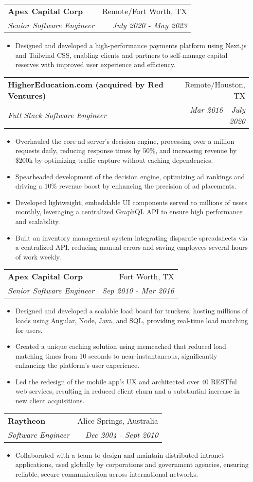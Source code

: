 \documentclass[letterpaper,11pt]{article}
\makeatletter
\newcommand{\resumeItem}[1]{
    \item\small{
      {#1 \vspace{-2pt}}
    }
  }
\newcommand{\resumeSubheading}[4]{
    \vspace{-1pt}\item
      \begin{tabular*}{0.97\textwidth}{l@{\extracolsep{\fill}}r}
        \textbf{#1} & #2 \\
        \textit{\small#3} & \textit{\small #4} \\
      \end{tabular*}\vspace{-5pt}
  }
\newcommand{\resumeItemListStart}{\begin{itemize}}
\newcommand{\resumeItemListEnd}{\end{itemize}\vspace{-5pt}}
\makeatother
\begin{document}
    \resumeSubheading
        {Apex Capital Corp}{Remote/Fort Worth, TX}
        {Senior Software Engineer}{July 2020 - May 2023}
        \resumeItemListStart
          \resumeItem
            {Designed and developed a high-performance payments platform using Next.js and Tailwind CSS, enabling clients and partners to self-manage capital reserves with improved user experience and efficiency.}
        \resumeItemListEnd

      \resumeSubheading
        {HigherEducation.com (acquired by Red Ventures)}{Remote/Houston, TX}
        {Full Stack Software Engineer}{Mar 2016 - July 2020}
        \resumeItemListStart
          \resumeItem
            {Overhauled the core ad server's decision engine, processing over a million requests daily, reducing response times by 50\%, and increasing revenue by \$200k by optimizing traffic capture without caching dependencies.}
          \resumeItem
            {Spearheaded development of the decision engine, optimizing ad rankings and driving a 10\% revenue boost by enhancing the precision of ad placements.}
          \resumeItem
            {Developed lightweight, embeddable UI components served to millions of users monthly, leveraging a centralized GraphQL API to ensure high performance and scalability.}
          \resumeItem
            {Built an inventory management system integrating disparate spreadsheets via a centralized API, reducing manual errors and saving employees several hours of work weekly.}
        \resumeItemListEnd

      \resumeSubheading
        {Apex Capital Corp}{Fort Worth, TX}
        {Senior Software Engineer}{Sep 2010 - Mar 2016}
        \resumeItemListStart
          \resumeItem
            {Designed and developed a scalable load board for truckers, hosting millions of loads using Angular, Node, Java, and SQL, providing real-time load matching for users.}
          \resumeItem
            {Created a unique caching solution using memcached that reduced load matching times from 10 seconds to near-instantaneous, significantly enhancing the platform's user experience.}
          \resumeItem
            {Led the redesign of the mobile app’s UX and architected over 40 RESTful web services, resulting in reduced client churn and a substantial increase in new client acquisitions.}
        \resumeItemListEnd

      \resumeSubheading
        {Raytheon}{Alice Springs, Australia}
        {Software Engineer}{Dec 2004 - Sept 2010}
        \resumeItemListStart
          \resumeItem
            {Collaborated with a team to design and maintain distributed intranet applications, used globally by corporations and government agencies, ensuring reliable, secure communication across international networks.}
        \resumeItemListEnd
\end{document}
